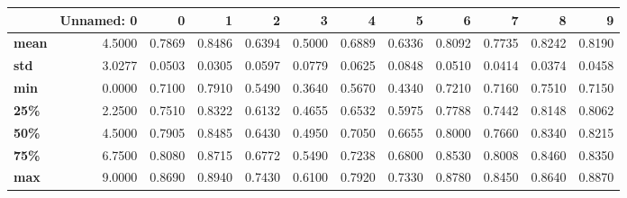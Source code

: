 \begin{tabular}{lrrrrrrrrrrr}
\toprule
{} &  Unnamed: 0 &       0 &       1 &       2 &       3 &       4 &       5 &       6 &       7 &       8 &       9 \\
\midrule
\textbf{mean} &      4.5000 &  0.7869 &  0.8486 &  0.6394 &  0.5000 &  0.6889 &  0.6336 &  0.8092 &  0.7735 &  0.8242 &  0.8190 \\
\textbf{std } &      3.0277 &  0.0503 &  0.0305 &  0.0597 &  0.0779 &  0.0625 &  0.0848 &  0.0510 &  0.0414 &  0.0374 &  0.0458 \\
\textbf{min } &      0.0000 &  0.7100 &  0.7910 &  0.5490 &  0.3640 &  0.5670 &  0.4340 &  0.7210 &  0.7160 &  0.7510 &  0.7150 \\
\textbf{25\% } &      2.2500 &  0.7510 &  0.8322 &  0.6132 &  0.4655 &  0.6532 &  0.5975 &  0.7788 &  0.7442 &  0.8148 &  0.8062 \\
\textbf{50\% } &      4.5000 &  0.7905 &  0.8485 &  0.6430 &  0.4950 &  0.7050 &  0.6655 &  0.8000 &  0.7660 &  0.8340 &  0.8215 \\
\textbf{75\% } &      6.7500 &  0.8080 &  0.8715 &  0.6772 &  0.5490 &  0.7238 &  0.6800 &  0.8530 &  0.8008 &  0.8460 &  0.8350 \\
\textbf{max } &      9.0000 &  0.8690 &  0.8940 &  0.7430 &  0.6100 &  0.7920 &  0.7330 &  0.8780 &  0.8450 &  0.8640 &  0.8870 \\
\bottomrule
\end{tabular}
